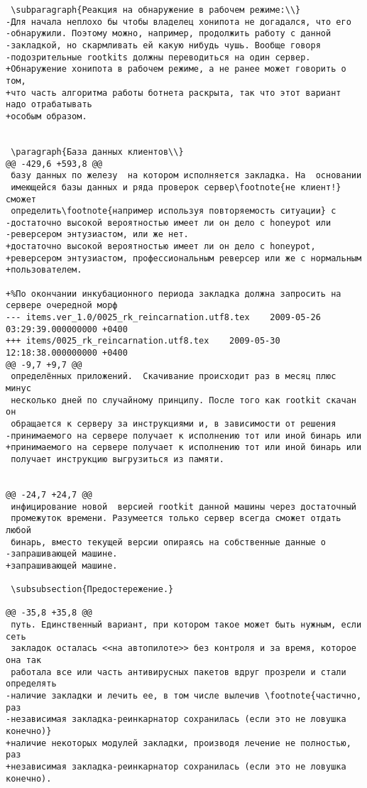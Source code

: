 \begin{verbatim}
 \subparagraph{Реакция на обнаружение в рабочем режиме:\\}
-Для начала неплохо бы чтобы владелец хонипота не догадался, что его
-обнаружили. Поэтому можно, например, продолжить работу с данной
-закладкой, но скармливать ей какую нибудь чушь. Вообще говоря
-подозрительные rootkits должны переводиться на один сервер.
+Обнаружение хонипота в рабочем режиме, а не ранее может говорить о том,
+что часть алгоритма работы ботнета раскрыта, так что этот вариант надо отрабатывать
+особым образом.


 \paragraph{База данных клиентов\\}
@@ -429,6 +593,8 @@
 базу данных по железу  на котором исполняется закладка. На  основании
 имеющейся базы данных и ряда проверок сервер\footnote{не клиент!} сможет
 определить\footnote{например используя повторяемость ситуации} с
-достаточно высокой вероятностью имеет ли он дело с honeypot или
-реверсером энтузиастом, или же нет.
+достаточно высокой вероятностью имеет ли он дело с honeypot,
+реверсером энтузиастом, профессиональным реверсер или же с нормальным
+пользователем.

+%По окончании инкубационного периода закладка должна запросить на сервере очередной морф
--- items.ver_1.0/0025_rk_reincarnation.utf8.tex	2009-05-26 03:29:39.000000000 +0400
+++ items/0025_rk_reincarnation.utf8.tex	2009-05-30 12:18:38.000000000 +0400
@@ -9,7 +9,7 @@
 определённых приложений.  Скачивание происходит раз в месяц плюс минус
 несколько дней по случайному принципу. После того как rootkit скачан он
 обращается к серверу за инструкциями и, в зависимости от решения
-принимаемого на сервере получает к исполнению тот или иной бинарь или
+принимаемого на сервере получает к исполнению тот или иной бинарь или
 получает инструкцию выгрузиться из памяти.


@@ -24,7 +24,7 @@
 инфицирование новой  версией rootkit данной машины через достаточный
 промежуток времени. Разумеется только сервер всегда сможет отдать любой
 бинарь, вместо текущей версии опираясь на собственные данные о
-запрашивающей машине.
+запрашивающей машине.

 \subsubsection{Предостережение.}

@@ -35,8 +35,8 @@
 путь. Единственный вариант, при котором такое может быть нужным, если сеть
 закладок осталась <<на автопилоте>> без контроля и за время, которое она так
 работала все или часть антивирусных пакетов вдруг прозрели и стали определять
-наличие закладки и лечить ее, в том числе вылечив \footnote{частично, раз
-независимая закладка-реинкарнатор сохранилась (если это не ловушка конечно)}
+наличие некоторых модулей закладки, производя лечение не полностью, раз
+независимая закладка-реинкарнатор сохранилась (если это не ловушка конечно).




\end{verbatim}
